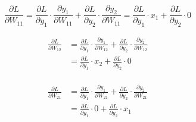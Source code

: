 \documentclass{article}
\begin{document}
\\
\[\frac { \partial L } { \partial W _ { 11 } } = \frac { \partial L } { \partial y _ { 1 } } \cdot \frac { \partial y _ { 1 } } { \partial W _ { 11 } } + \frac { \partial L } { \partial y _ { 2 } } \cdot \frac { \partial y _ { 2 } } { \partial W _ { 11 } }  = \frac { \partial L } { \partial y _ { 1 } } \cdot x _ { 1 } + \frac { \partial L } { \partial y _ { 2 } } \cdot  0\]

\[\begin{aligned} \frac { \partial L } { \partial W _ { 12 } } & = \frac { \partial L } { \partial y _ { 1 } } \cdot \frac { \partial y _ { 1 } } { \partial W _ { 12 } } + \frac { \partial L } { \partial y _ { 2 } } \cdot \frac { \partial y _ { 2 } } { \partial W _ { 12 } } \\ & = \frac { \partial L } { \partial y _ { 1 } } \cdot x _ { 2 } + \frac { \partial L } { \partial y _ { 2 } } \cdot 0 \end{aligned}\]
\\

\[\begin{aligned} \frac { \partial L } { \partial W _ { 21 } } & = \frac { \partial L } { \partial y _ { 1 } } \cdot \frac { \partial y _ { 1 } } { \partial W _ { 21 } } + \frac { \partial L } { \partial y _ { 2 } } \cdot \frac { \partial y _ { 2 } } { \partial W _ { 21 } } \\ & = \frac { \partial L } { \partial y _ { 1 } } \cdot 0 + \frac { \partial L } { \partial y _ { 2 } } \cdot x _ { 1 } \end{aligned}\]
\\
\end{document}
